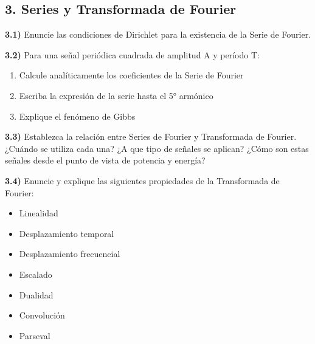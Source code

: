 \subsection*{3. Series y Transformada de Fourier}

\textbf{3.1)} Enuncie las condiciones de Dirichlet para la existencia de la Serie de Fourier.

\textbf{3.2)} Para una señal periódica cuadrada de amplitud A y período T:
\begin{enumerate}[label=\alph*)]
    \item Calcule analíticamente los coeficientes de la Serie de Fourier
    \item Escriba la expresión de la serie hasta el 5° armónico
    \item Explique el fenómeno de Gibbs
\end{enumerate}

\textbf{3.3)} Establezca la relación entre Series de Fourier y Transformada de Fourier. ¿Cuándo se utiliza cada una? ¿A que tipo de señales se aplican? ¿Cómo son estas señales desde el punto de vista de potencia y energía?

\textbf{3.4)} Enuncie y explique las siguientes propiedades de la Transformada de Fourier:
\begin{itemize}
    \item Linealidad
    \item Desplazamiento temporal
    \item Desplazamiento frecuencial
    \item Escalado
    \item Dualidad
    \item Convolución
    \item Parseval
\end{itemize}